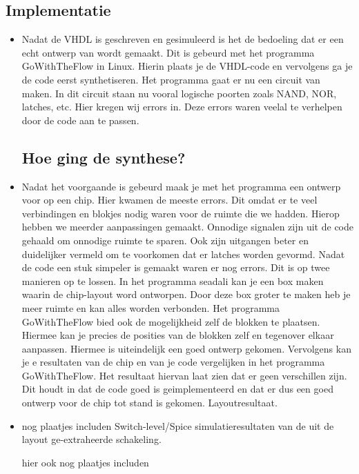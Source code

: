 





\subsection{Implementatie}
\begin{itemize}
\item Nadat de VHDL is geschreven en gesimuleerd is het de bedoeling dat er een echt ontwerp van wordt gemaakt. Dit is gebeurd met het programma GoWithTheFlow in Linux. Hierin plaats je de VHDL-code en vervolgens ga je de code eerst synthetiseren. Het programma gaat er nu een circuit van maken. In dit  circuit staan nu vooral logische poorten zoals NAND, NOR, latches, etc. Hier kregen wij errors in. Deze errors waren veelal te verhelpen door de code aan te passen.

\subsection{Hoe ging de synthese?}
\item 
 Nadat het voorgaande is gebeurd maak je met het programma een ontwerp voor op een chip. Hier kwamen de meeste errors. Dit omdat er te veel verbindingen en blokjes nodig waren voor de ruimte die we hadden. Hierop hebben we meerder aanpassingen gemaakt. Onnodige signalen zijn uit de code gehaald om onnodige ruimte te sparen. Ook zijn uitgangen beter en duidelijker vermeld om te voorkomen dat er latches worden gevormd. Nadat de code een stuk simpeler is gemaakt waren er nog errors. Dit is op twee manieren op te lossen. In het programma seadali kan je een box maken waarin de chip-layout word ontworpen. Door deze box groter  te maken heb je meer ruimte en kan alles worden verbonden. Het programma GoWithTheFlow bied ook de mogelijkheid zelf de blokken te plaatsen. Hiermee kan je precies de posities van de blokken zelf en tegenover elkaar aanpassen. Hiermee is uiteindelijk een goed ontwerp gekomen. Vervolgens kan je e resultaten van de chip en van je code vergelijken in het programma GoWithTheFlow. Het resultaat hiervan laat zien dat er geen verschillen zijn. Dit houdt in dat de code goed is geimplementeerd en dat er dus een goed ontwerp voor de chip tot stand is gekomen. 
Layoutresultaat.
\item 

nog plaatjes includen
Switch-level/Spice simulatieresultaten van de uit de layout ge-extraheerde schakeling.

hier ook nog plaatjes includen
\end{itemize}
























